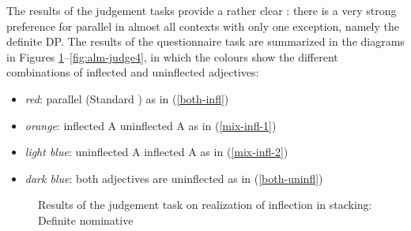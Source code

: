 \documentclass[output=paper,colorlinks,citecolor=brown]{langscibook}
\begin{document}
The results of the judgement tasks provide a rather clear : there is a very strong preference for parallel  in almost all contexts with only one exception, namely the definite  DP. The results of the questionnaire task are summarized in the diagrams in Figures \ref{fig:alm-judge1}--\ref{fig:alm-judge4}, in which the colours show the different combinations of inflected and uninflected adjectives:

\begin{itemize}
    \item \textit{red}: parallel  (Standard  ) as in (\ref{both-infl})
    \item \textit{orange}: inflected A uninflected A as in (\ref{mix-infl-1})
    \item \textit{light blue}: uninflected A inflected A as in (\ref{mix-infl-2})
    \item \textit{dark blue}: both adjectives are uninflected as in (\ref{both-uninfl})
\end{itemize}

%

\begin{figure}
\caption{Results of the judgement task on realization of inflection in stacking: Definite nominative}
\label{fig:alm-judge1}
\end{figure}
\end{document}
